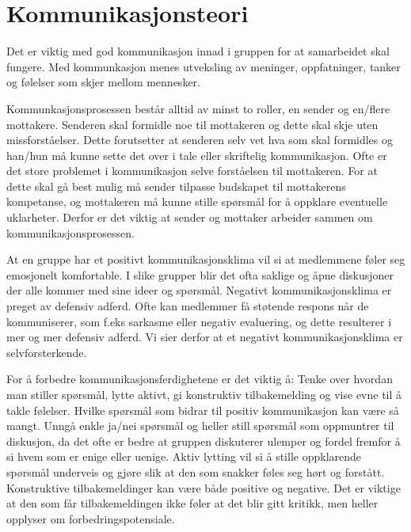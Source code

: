\section{Kommunikasjonsteori}
Det er viktig med god kommunikasjon innad i gruppen for at samarbeidet skal fungere. 
Med kommunkasjon menes utveksling av meninger, oppfatninger, tanker og følelser som skjer mellom mennesker.
\vspace{\secspace}

Kommunkasjonsprosessen består alltid av minst to roller, en sender og en/flere mottakere. 
Senderen skal formidle noe til mottakeren og dette skal skje uten missforståelser. 
Dette forutsetter at senderen selv vet hva som skal formidles og han/hun må kunne sette det over i tale eller skriftelig kommunikasjon. 
Ofte er det store problemet i kommunikasjon selve forståelsen til mottakeren. 
For at dette skal gå best mulig må sender tilpasse budskapet til mottakerens kompetanse, og mottakeren må kunne stille spørsmål for å oppklare eventuelle uklarheter. 
Derfor er det viktig at sender og mottaker arbeider sammen om kommunikasjonsprosessen.
\vspace{\secspace}

At en gruppe har et positivt kommunikasjonsklima vil si at medlemmene føler seg emosjonelt komfortable. 
I slike grupper blir det ofta saklige og åpne diskusjoner der alle kommer med sine ideer og spørsmål. 
Negativt kommunikasjonsklima er preget av defensiv adferd. 
Ofte kan medlemmer få støtende respons når de kommuniserer, som f.eks sarkasme eller negativ evaluering, og dette resulterer i mer og mer defensiv adferd. 
Vi sier derfor at et negativt kommunikasjonsklima er selvforsterkende. 
\vspace{\secspace}

For å forbedre kommunikasjonsferdighetene er det viktig å: Tenke over hvordan man stiller spørsmål, lytte aktivt, gi konstruktiv tilbakemelding og vise evne til å takle følelser. 
Hvilke spørsmål som bidrar til positiv kommunikasjon kan være så mangt. 
Unngå enkle ja/nei spørsmål og heller still spørsmål som oppmuntrer til diskusjon, da det ofte er bedre at gruppen diskuterer ulemper og fordel fremfor å si hvem som er enige eller uenige. 
Aktiv lytting vil si å stille oppklarende spørsmål underveis og gjøre slik at den som snakker føles seg hørt og forstått. 
Konstruktive tilbakemeldinger kan være både positive og negative. 
Det er viktige at den som får tilbakemeldingen ikke føler at det blir gitt kritikk, men heller opplyser om forbedringspotensiale. 